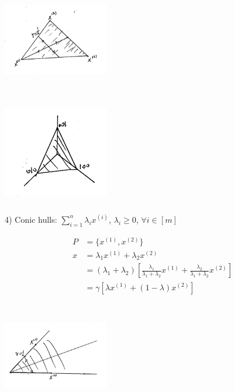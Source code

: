 \begin{marginfigure}
	\centering
	\includegraphics[width=1.8in,height=1.8in]{figures/ch08/figure1023_2.png}
\end{marginfigure}

\begin{marginfigure}
	\centering
	\includegraphics[width=1.8in,height=1.8in]{figures/ch08/figure1023_3.png}
\end{marginfigure}

4) Conic hulls: $\sum^n_{i=1}\lambda_i x^{(i)}$, $\lambda_i \geq 0$, $\forall i\in [m]$

\begin{align*}
P &= \{x^{(1)}, x^{(2)} \}\\
x &= \lambda_1x^{(1)} + \lambda_2x^{(2)}\\
&= ( \lambda_1 + \lambda_2)[\frac{\lambda_1}{\lambda_1 + \lambda_2}x^{(1)} + \frac{\lambda_2}{\lambda_1 + \lambda_2}x^{(2)}]\\
&= \gamma[\lambda x^{(1)} + (1-\lambda)x^{(2)}]
\end{align*}

\begin{marginfigure}
	\centering
	\includegraphics[width=1.8in,height=1.8in]{figures/ch08/figure1023_4.png}
\end{marginfigure}

